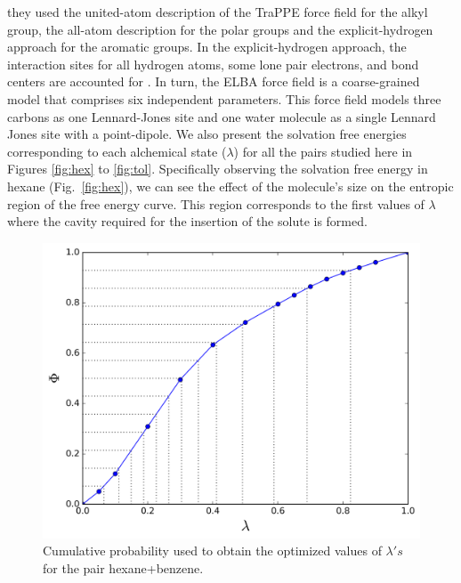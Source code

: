 \documentclass[final,12p,times,twocolumn]{elsarticle}
\begin{document}
they used the united-atom description of the TraPPE force field for the alkyl group, the all-atom description for the polar groups and the explicit-hydrogen approach for the aromatic groups. In the explicit-hydrogen approach, the interaction sites for all hydrogen atoms, some lone pair electrons, and bond centers are accounted for \cite{doi:10.1021/jp073586l}. In turn, the ELBA force field is a coarse-grained model that comprises six independent parameters. This force field models three carbons as one Lennard-Jones site and one water molecule as a single Lennard Jones site with a point-dipole. We also present the solvation free energies corresponding to each alchemical state ($\lambda$) for all the pairs studied here in Figures \ref{fig:hex} to \ref{fig:tol}. Specifically observing the solvation free energy in hexane (Fig.~\ref{fig:hex}), we can see the effect of the molecule's size on the entropic region of the free energy curve. This region corresponds to the first values of $\lambda$ where the cavity required for the insertion of the solute is formed.
	
	\begin{figure}[h]
		\centering
		\includegraphics[width=1.0\linewidth]{Figures/optimized_cdf}
		\caption{Cumulative probability used to obtain the optimized values of $\lambda 's$ for the pair hexane+benzene.}
		\label{fig:optimized_cdf}
	\end{figure}
	
\end{document}
